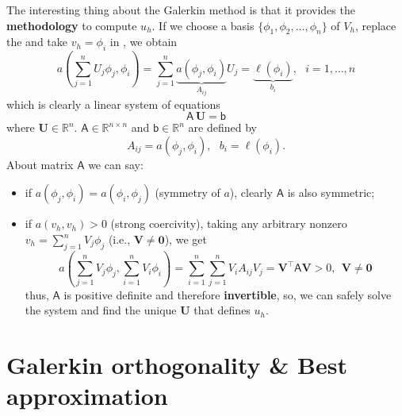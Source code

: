 \bigskip
The interesting thing about the Galerkin method is that it provides
the \textbf{methodology} to compute $u_h$. If we choose a basis
$\{\phi_1,\phi_2,\dots,\phi_n\}$ of $V_h$, replace the
 and take $v_h = \phi_i$ in ,
we obtain
\begin{equation}
a\left (\sum_{j=1}^{n}{U_j\phi_j}, \phi_i\right) = \sum_{j=1}^{n}{\underbrace{a(\phi_j,\phi_i)}_{A_{ij}}U_j} =
\underbrace{\ell(\phi_i)}_{b_i},~~~i=1,\dots,n
\end{equation}
which is clearly a linear system of equations
\begin{equation}
\mathsf{A} \, \mathbf{U} = \mathsf{b}
\end{equation}
where $\mathbf{U} \in \mathbb{R}^{n}$.
$\mathsf{A} \in \mathbb{R}^{n \times n}$ and $\mathsf{b} \in \mathbb{R}^{n}$
are defined by
\begin{equation}
A_{ij} = a(\phi_j,\phi_i),~~~b_i = \ell(\phi_i).
\end{equation}
About matrix $\mathsf{A}$ we can say:
\begin{itemize}
\item if $a(\phi_j,\phi_i) = a(\phi_i,\phi_j)$ (symmetry of $a$),
clearly $\mathsf{A}$ is also symmetric;\\
\item if $a(v_h,v_h) > 0$ (strong coercivity), taking
any arbitrary nonzero $v_h = \sum_{j=1}^{n}{V_j\phi_j}$
(i.e., $\mathbf{V} \ne \mathbf{0}$), we get
\begin{equation}
a\left (\sum_{j=1}^{n}{V_j\phi_j},\sum_{i=1}^{n}{V_i\phi_i} \right) = \sum_{i=1}^{n}\sum_{j=1}^{n}{V_iA_{ij}V_j}
= \mathbf{V}^{\intercal} \mathsf{A} \mathbf{V} > 0,~~\mathbf{V} \ne \mathbf{0}
\end{equation}
thus, $\mathsf{A}$ is positive definite and therefore \textbf{invertible},
so, we can safely solve the system and find the unique $\mathbf{U}$
that defines $u_h$. \\
\end{itemize}

\section{Galerkin orthogonality \& Best approximation} 

